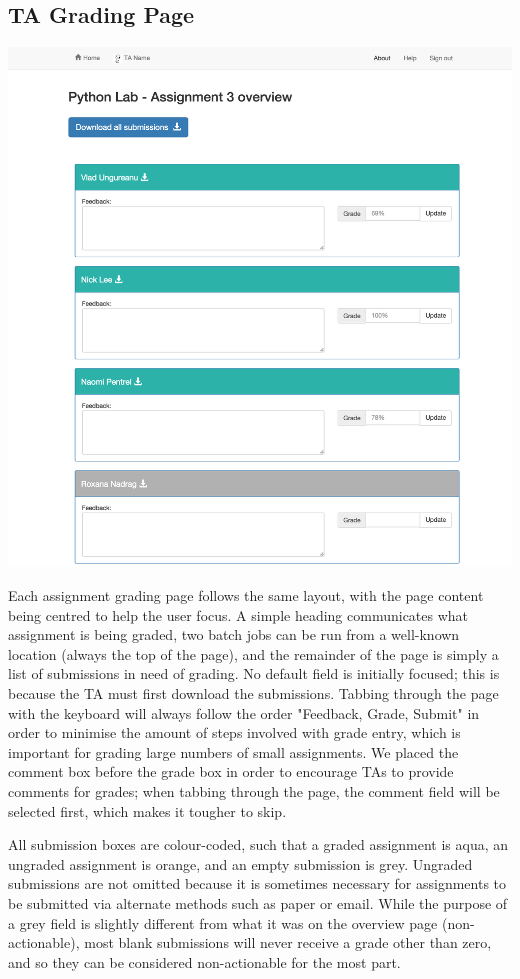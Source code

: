 \subsection{TA Grading Page}

\includegraphics[width=\textwidth]{screenshots/GradingAssignmentOverview.png}

Each assignment grading page follows the same layout, with the page content being centred to help the user focus. A simple heading communicates what assignment is being graded, two batch jobs can be run from a well-known location (always the top of the page), and the remainder of the page is simply a list of submissions in need of grading. 
\newpage
No default field is initially focused; this is because the TA must first download the submissions. Tabbing through the page with the keyboard will always follow the order "Feedback, Grade, Submit" in order to minimise the amount of steps involved with grade entry, which is important for grading large numbers of small assignments. We placed the comment box before the grade box in order to encourage TAs to provide comments for grades; when tabbing through the page, the comment field will be selected first, which makes it tougher to skip.

All submission boxes are colour-coded, such that a graded assignment is aqua, an ungraded assignment is orange, and an empty submission is grey. Ungraded submissions are not omitted because it is sometimes necessary for assignments to be submitted via alternate methods such as paper or email. While the purpose of a grey field is slightly different from what it was on the overview page (non-actionable), most blank submissions will never receive a grade other than zero, and so they can be considered non-actionable for the most part. 

